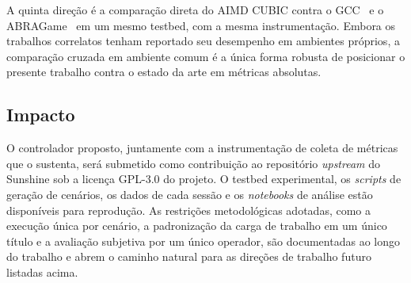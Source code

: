 A quinta direção é a comparação direta do AIMD CUBIC contra o
GCC~\cite{gcc} e o ABRAGame~\cite{abragame} em um mesmo
testbed, com a mesma instrumentação. Embora os trabalhos
correlatos tenham reportado seu desempenho em ambientes
próprios, a comparação cruzada em ambiente comum é a única
forma robusta de posicionar o presente trabalho contra o
estado da arte em métricas absolutas.

\subsection{Impacto}

O controlador proposto, juntamente com a instrumentação de
coleta de métricas que o sustenta, será submetido como
contribuição ao repositório \emph{upstream} do Sunshine sob a
licença GPL-3.0 do projeto. O testbed experimental, os
\emph{scripts} de geração de cenários, os dados de cada
sessão e os \emph{notebooks} de análise estão disponíveis para
reprodução. As restrições metodológicas adotadas, como a
execução única por cenário, a padronização da carga de
trabalho em um único título e a avaliação subjetiva por um
único operador, são documentadas ao longo do trabalho e
abrem o caminho natural para as direções de trabalho futuro
listadas acima.
